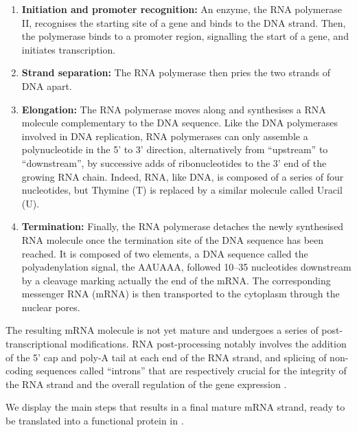 \begin{enumerate}
    \item \textbf{Initiation and promoter recognition:} An enzyme, the RNA polymerase II, recognises the starting site of a gene and binds to the DNA strand. Then, the polymerase binds to a promoter region, signalling the start of a gene, and initiates transcription.
    \item \textbf{Strand separation:} The RNA polymerase then pries the two strands of DNA apart.  
    \item \textbf{Elongation:} The RNA polymerase moves along and synthesises a RNA molecule complementary to the DNA sequence. Like the DNA polymerases involved in DNA replication, RNA polymerases can only assemble a polynucleotide in the 5' to 3' direction, alternatively from \enquote{upstream} to \enquote{downstream}, by successive adds of ribonucleotides to the 3' end of the growing RNA chain. Indeed, RNA, like DNA, is composed of a series of four nucleotides, but Thymine (T) is replaced by a similar molecule called Uracil (U).
    \item \textbf{Termination:} Finally, the RNA polymerase detaches the newly synthesised RNA molecule once the termination site of the DNA sequence has been reached. It is composed of two elements, a DNA sequence called the polyadenylation signal, the AAUAAA, followed 10–35 nucleotides downstream by a cleavage marking actually the end of the mRNA. The corresponding messenger RNA (mRNA) is then transported to the cytoplasm through the nuclear pores.  
\end{enumerate}

The resulting mRNA molecule is not yet mature and undergoes a series of post-transcriptional modifications. RNA post-processing notably involves the addition of the 5' cap and poly-A tail at each end of the RNA strand, and splicing of non-coding sequences called \enquote{introns} that are respectively crucial for the integrity of the RNA strand and the overall regulation of the gene expression .

We display the main steps that results in a final mature mRNA strand, ready to be translated into a functional protein in .


